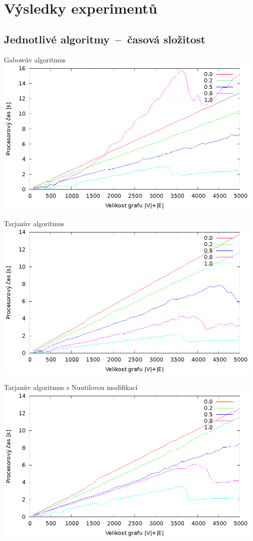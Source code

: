 \documentclass{beamer}
\begin{document}
\section{Výsledky experimentů}
\subsection{Jednotlivé algoritmy\ --\ časová složitost}
\begin{frame}{Gabowův algoritmus}
  \includegraphics[width=\textwidth,height=\textheight,keepaspectratio]{gabow}
\end{frame}
\begin{frame}{Tarjanův algoritmus}
  \includegraphics[width=\textwidth,height=\textheight,keepaspectratio]{tarjan}
\end{frame}
\begin{frame}{Tarjanův algoritmus s Nuutilovou modifikací}
  \includegraphics[width=\textwidth,height=\textheight,keepaspectratio]{tarjan_nx}
\end{frame}
\end{document}
